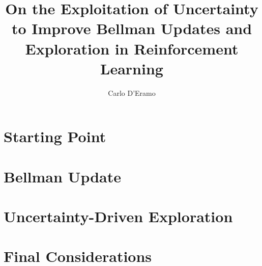 \documentclass[10pt,twoside,openright,english,italian]{book}%
\author{Carlo D'Eramo}
\title{On the Exploitation of Uncertainty to Improve Bellman Updates and Exploration in Reinforcement Learning}
\begin{document}

\maketitle

\pagestyle{empty}

\cleardoublepage
\newpage

%

\cleardoublepage
\newpage

\pagestyle{fancy}
\setcounter{page}{1}





\tableofcontents
\cleardoublepage

\newpage

\listoffigures
\newpage
{}\listofalgorithms

\printglossaries

\cleardoublepage

\setcounter{page}{1}
\part{Starting Point}

\part{Bellman Update}


\part{Uncertainty-Driven Exploration}


\part{Final Considerations}



\cleardoublepage
{}
{}
\small



\appendix

\end{document}
